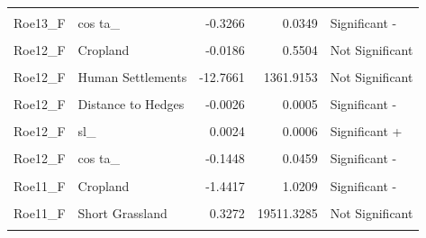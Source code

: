 \documentclass[10pt,a4paper]{article}
\begin{document}
\begin{longtable}[t]{llrrl}
\addlinespace
\cellcolor{gray!10}{Roe13\_F} & \cellcolor{gray!10}{log sl\_} & \cellcolor{gray!10}{0.0278} & \cellcolor{gray!10}{0.0327} & \cellcolor{gray!10}{Not Significant}\\
Roe13\_F & cos ta\_ & -0.3266 & 0.0349 & Significant -\\
\cellcolor{gray!10}{Roe12\_F} & \cellcolor{gray!10}{Evergreen Needleleaf Forest} & \cellcolor{gray!10}{0.7455} & \cellcolor{gray!10}{0.4908} & \cellcolor{gray!10}{Significant +}\\
Roe12\_F & Cropland & -0.0186 & 0.5504 & Not Significant\\
\cellcolor{gray!10}{Roe12\_F} & \cellcolor{gray!10}{Tall Grassland} & \cellcolor{gray!10}{1.0835} & \cellcolor{gray!10}{0.4904} & \cellcolor{gray!10}{Significant +}\\
\addlinespace
Roe12\_F & Human Settlements & -12.7661 & 1361.9153 & Not Significant\\
\cellcolor{gray!10}{Roe12\_F} & \cellcolor{gray!10}{Distance to Woodland} & \cellcolor{gray!10}{-0.0097} & \cellcolor{gray!10}{0.0011} & \cellcolor{gray!10}{Significant -}\\
Roe12\_F & Distance to Hedges & -0.0026 & 0.0005 & Significant -\\
\cellcolor{gray!10}{Roe12\_F} & \cellcolor{gray!10}{Road Crossing} & \cellcolor{gray!10}{-1.5267} & \cellcolor{gray!10}{0.2198} & \cellcolor{gray!10}{Significant -}\\
Roe12\_F & sl\_ & 0.0024 & 0.0006 & Significant +\\
\addlinespace
\cellcolor{gray!10}{Roe12\_F} & \cellcolor{gray!10}{log sl\_} & \cellcolor{gray!10}{-0.0230} & \cellcolor{gray!10}{0.0646} & \cellcolor{gray!10}{Not Significant}\\
Roe12\_F & cos ta\_ & -0.1448 & 0.0459 & Significant -\\
\cellcolor{gray!10}{Roe11\_F} & \cellcolor{gray!10}{Evergreen Needleleaf Forest} & \cellcolor{gray!10}{1.9865} & \cellcolor{gray!10}{0.7344} & \cellcolor{gray!10}{Significant +}\\
Roe11\_F & Cropland & -1.4417 & 1.0209 & Significant -\\
\cellcolor{gray!10}{Roe11\_F} & \cellcolor{gray!10}{Tall Grassland} & \cellcolor{gray!10}{1.7737} & \cellcolor{gray!10}{0.7350} & \cellcolor{gray!10}{Significant +}\\
\addlinespace
Roe11\_F & Short Grassland & 0.3272 & 19511.3285 & Not Significant\\
\cellcolor{gray!10}{Roe11\_F} & \cellcolor{gray!10}{Human Settlements} & \cellcolor{gray!10}{-16.0515} & \cellcolor{gray!10}{6008.3981} & \cellcolor{gray!10}{Not Significant}\\

\end{longtable}
\end{document}
